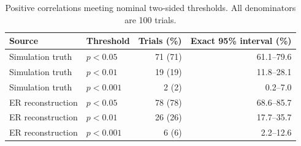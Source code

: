 \begin{table}[ht]
\centering
\caption{Positive correlations meeting nominal two-sided thresholds. All denominators are 100 trials.}
\label{tab:neff-detection}
\begin{tabular}{llrr}
\toprule
Source & Threshold & Trials (\%) & Exact 95\% interval (\%) \\
\midrule
Simulation truth & $p<0.05$ & 71 (71) & 61.1--79.6 \\
Simulation truth & $p<0.01$ & 19 (19) & 11.8--28.1 \\
Simulation truth & $p<0.001$ & 2 (2) & 0.2--7.0 \\
ER reconstruction & $p<0.05$ & 78 (78) & 68.6--85.7 \\
ER reconstruction & $p<0.01$ & 26 (26) & 17.7--35.7 \\
ER reconstruction & $p<0.001$ & 6 (6) & 2.2--12.6 \\
\bottomrule
\end{tabular}
\end{table}
